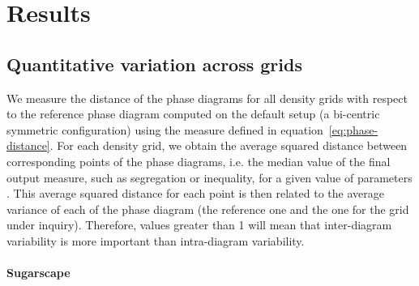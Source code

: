 \documentclass[3p,times,procedia]{elsarticle}
\begin{document}
\section{Results}


\subsection{Quantitative variation across grids}

We measure the distance of the phase diagrams for all density grids with respect to the reference phase diagram computed on the default  setup (a bi-centric symmetric configuration) using the  measure defined in equation~\ref{eq:phase-distance}. For each density grid, we  obtain the average squared distance between corresponding points of the phase diagrams, i.e. the median value of the final output measure, such as segregation or inequality, for a given value of parameters . This average squared distance for each point is then related to the average variance of each of the phase diagram (the reference one and the one for the grid under inquiry). Therefore, values greater than 1 will mean that inter-diagram variability is more important than intra-diagram variability.

\paragraph{Sugarscape} 


\end{document}
